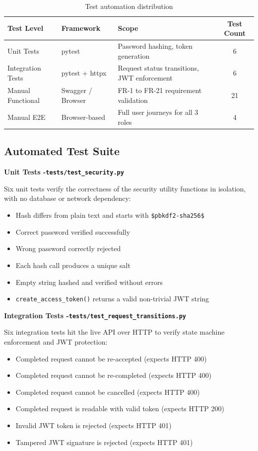 \begin{table}[H]
\caption{Test automation distribution}
\centering
\renewcommand{\arraystretch}{1.3}
\begin{tabular}{|l|l|p{4.5cm}|c|}
\hline
\rowcolor{cyan!20}
\textbf{Test Level} & \textbf{Framework} & \textbf{Scope} & \textbf{Test Count} \\
\hline
Unit Tests & pytest & Password hashing, token generation & 6 \\
\hline
Integration Tests & pytest + httpx & Request status transitions, JWT enforcement & 6 \\
\hline
Manual Functional & Swagger / Browser & FR-1 to FR-21 requirement validation & 21 \\
\hline
Manual E2E & Browser-based & Full user journeys for all 3 roles & 4 \\
\hline
\end{tabular}
\label{tab:automation_dist}
\end{table}

\subsection{Automated Test Suite}

\textbf{Unit Tests -\texttt{tests/test\_security.py}}

Six unit tests verify the correctness of the security utility functions in isolation, with no database or network dependency:
\newpage
\begin{itemize}[noitemsep]
    \item Hash differs from plain text and starts with \texttt{\$pbkdf2-sha256\$}
    \item Correct password verified successfully
    \item Wrong password correctly rejected
    \item Each hash call produces a unique salt
    \item Empty string hashed and verified without errors
    \item \texttt{create\_access\_token()} returns a valid non-trivial JWT string
\end{itemize}

\textbf{Integration Tests -\texttt{tests/test\_request\_transitions.py}}

Six integration tests hit the live API over HTTP to verify state machine enforcement and JWT protection:

\begin{itemize}[noitemsep]
    \item Completed request cannot be re-accepted (expects HTTP 400)
    \item Completed request cannot be re-completed (expects HTTP 400)
    \item Completed request cannot be cancelled (expects HTTP 400)
    \item Completed request is readable with valid token (expects HTTP 200)
    \item Invalid JWT token is rejected (expects HTTP 401)
    \item Tampered JWT signature is rejected (expects HTTP 401)
\end{itemize}


